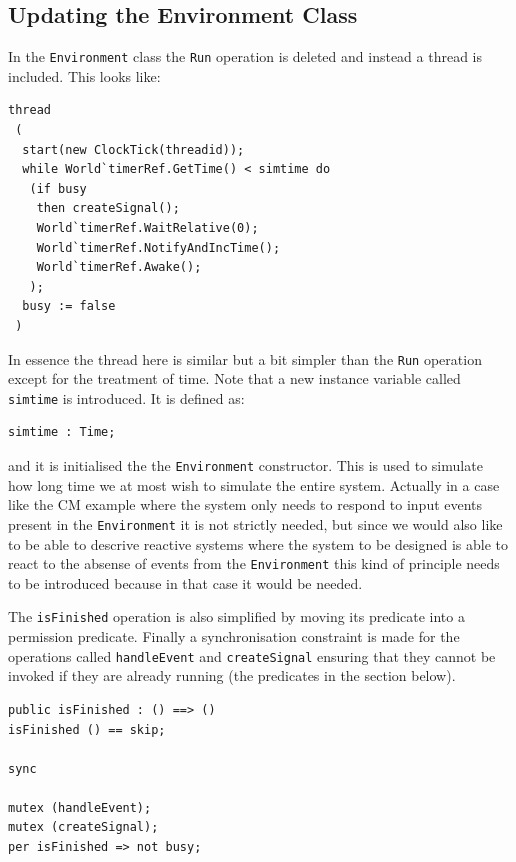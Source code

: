 \documentclass{overturerepchap}
\begin{document}
\subsection{Updating the Environment Class}

In the \texttt{Environment} class the \texttt{Run} operation is
deleted and instead a thread is included. This looks like:

\begin{lstlisting}
thread
 (
  start(new ClockTick(threadid));
  while World`timerRef.GetTime() < simtime do
   (if busy
    then createSignal();
    World`timerRef.WaitRelative(0);
    World`timerRef.NotifyAndIncTime();
    World`timerRef.Awake();
   );
  busy := false
 )
\end{lstlisting}

In essence the thread here is similar but a bit simpler than the
\texttt{Run} operation except for the treatment of time. Note that a
new instance variable called \texttt{simtime} is introduced. It is
defined as:

\begin{lstlisting}
simtime : Time;
\end{lstlisting}
and it is initialised the the \texttt{Environment} constructor. This
is used to simulate how long time we at most wish to simulate the
entire system. Actually in a case like the CM example where the system
only needs to respond to input events present in the
\texttt{Environment} it is not strictly needed, but since we would
also like to be able to descrive reactive systems where the system to
be designed is able to react to the absense of events from the
\texttt{Environment} this kind of principle needs to be introduced
because in that case it would be needed.

The \texttt{isFinished} operation is also simplified by moving its
predicate into a permission predicate. Finally a synchronisation
constraint is made for the operations called
\texttt{handleEvent} and \texttt{createSignal}
ensuring that they cannot be invoked if they
are already running (the {\bf{}} predicates in the
{\bf{}} 
section below).

\begin{lstlisting}
public isFinished : () ==> ()
isFinished () == skip;

sync

mutex (handleEvent);
mutex (createSignal);
per isFinished => not busy;
\end{lstlisting}
\end{document}

